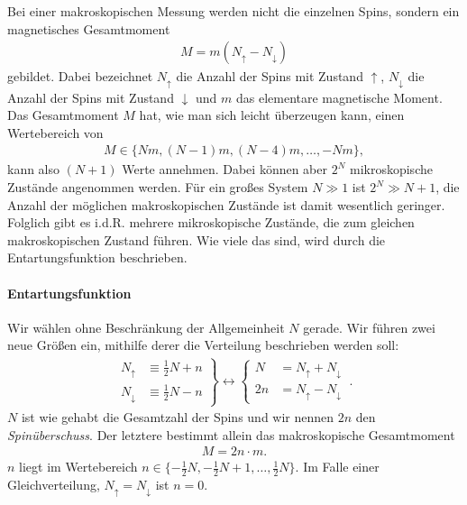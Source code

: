 Bei einer makroskopischen Messung werden nicht die einzelnen Spins, sondern ein magnetisches Gesamtmoment
\begin{align*}
    M=m(N_\uparrow-N_\downarrow)
\end{align*}
gebildet. Dabei bezeichnet $N_\uparrow$ die Anzahl der Spins mit Zustand $\uparrow$, $N_\downarrow$ die Anzahl der Spins mit Zustand $\downarrow$ und $m$ das elementare magnetische Moment. Das Gesamtmoment $M$ hat, wie man sich leicht überzeugen kann, einen Wertebereich von
\begin{align*}
    M\in\{Nm,(N-1)m,(N-4)m,\ldots ,-Nm\},
\end{align*}
kann also $(N+1)$ Werte annehmen. Dabei können aber $2^N$ mikroskopische Zustände angenommen werden. Für ein großes System $N \gg 1$ ist $2^N \gg N+1$, die Anzahl der möglichen makroskopischen Zustände ist damit wesentlich geringer. Folglich gibt es i.d.R. mehrere mikroskopische Zustände, die zum gleichen makroskopischen Zustand führen. Wie viele das sind, wird durch die Entartungsfunktion beschrieben.


\paragraph*{Entartungsfunktion}

Wir wählen ohne Beschränkung der Allgemeinheit $N$ gerade. Wir führen zwei neue Größen ein, mithilfe derer die Verteilung beschrieben werden soll:
\begin{align*}
    \left.
    \begin{aligned}
        N_\uparrow   & \equiv \frac{1}{2} N+n \\
        N_\downarrow & \equiv \frac{1}{2}N-n
    \end{aligned}
    \right\} \leftrightarrow
    \left\{
    \begin{aligned}
        N  & = N_\uparrow + N_\downarrow \\
        2n & = N_\uparrow-N_\downarrow
    \end{aligned}
    \right. \:.
\end{align*}
$N$ ist wie gehabt die Gesamtzahl der Spins und wir nennen $2n$ den \emph{Spinüberschuss}. Der letztere bestimmt allein das makroskopische Gesamtmoment
\begin{align*}
    M=2n\cdot m.
\end{align*}
$n$ liegt im Wertebereich $n\in\{-\frac{1}{2}N,-\frac{1}{2}N+1,\dots,\frac{1}{2}N\}$. Im Falle einer Gleichverteilung, $N_\uparrow=N_\downarrow$ ist $n=0$.

